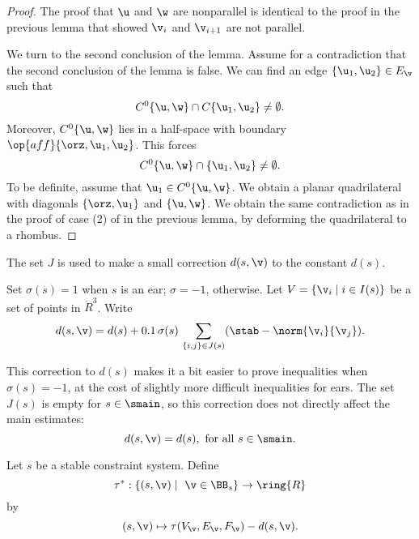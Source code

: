 \begin{proof} 
The proof that $\u$ and $\w$ are nonparallel is identical to the
proof in the previous lemma that showed $\v_i$ and $\v_{i+1}$ are not parallel.

We turn to the second conclusion of the lemma.
Assume for a contradiction that the second conclusion of the lemma is false.
We can find an edge $\{\u_1,\u_2\}\in E_\v$ such that 
\[
C^0\{\u,\w\}\cap C\{\u_1,\u_2\}\ne \emptyset.
\]
Moreover, $C^0\{\u,\w\}$ lies in a half-space with boundary
$\op{aff}\{\orz,\u_1,\u_2\}$.  This forces 
\[
C^0\{\u,\w\}\cap \{\u_1,\u_2\}\ne \emptyset.
\]
To be definite, assume that $\u_1\in C^0\{\u,\w\}$.  
We obtain a planar quadrilateral with diagonals
$\{\orz,\u_1\}$ and $\{\u,\w\}$.  We obtain the same contradiction
as in the proof of case (2) of  in the previous lemma,
by deforming the quadrilateral to a rhombus.
\end{proof}

The set $J$ is used to make a small correction $d(s,\v)$ to the
constant $d(s)$.  


\begin{definition}[$d(s,\v)$]
Set $\sigma(s) =1$ when $s$ is an ear;  $\sigma =
-1$, otherwise.  Let $V=\{\v_i\mid i\in I(s)\}$ 
be a set of points in $\ring{R}^3$.
Write
\begin{equation}
d(s,\v) = d(s) +  0.1\, \sigma(s)\,\sum_{\{i,j\}\in J(s)} (\stab - \norm{\v_i}{\v_j}).
\end{equation}
\end{definition}
%
%

This correction to $d(s)$  makes it a bit easier to prove inequalities when
$\sigma(s)=-1$, at the cost of slightly more difficult inequalities for ears.
The set $J(s)$ is empty for $s\in \smain$, so this correction does not
directly affect the main estimates:
\[
d(s,\v) = d(s), \text{ for all } s \in \smain.
\]


\begin{definition}[$\tau^*$]\label{def:tau-star}
%
Let $s$ be a stable constraint system.  Define 
\[
\tau^*:\{(s,\v)\mid \ \v\in \BB_s\} \to \ring{R}
\] 
by
\[ 
(s,\v) \mapsto \tau(V_\v,E_\v,F_\v)-d(s,\v).
\] 
%
\end{definition}

